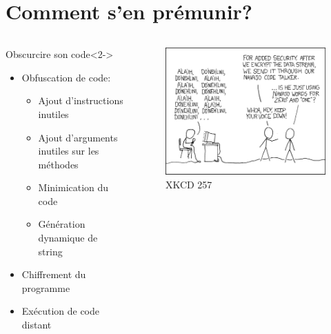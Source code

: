 \documentclass[aspectratio=1610]{beamer}%
\begin{document}
 

\section{Comment s'en prémunir?}
\begin{frame}
  \begin{columns}
    \begin{column}[t]{0.48\linewidth}
      \centering
      \begin{block}{Obscurcire son code}<2->
        \begin{itemize}
          \item<3-> Obfuscation de code:
          \begin{itemize}
          \item<4-> Ajout d'instructions inutiles
          \item<5-> Ajout d'arguments inutiles sur les méthodes
          \item<6-> Minimication du code
          \item<7-> Génération dynamique de string
          \end{itemize}
          \item<8-> Chiffrement du programme
          \item<9-> Exécution de code distant
          \end{itemize}
      \end{block}
    \end{column}
    \begin{column}[t]{0.48\linewidth}
      \centering
        \begin{figure}
          \includegraphics[width=\linewidth]{img/obscurity.png}
          \caption{XKCD 257}
        \end{figure}
    \end{column}
  \end{columns}
  \end{frame}
\end{document}
